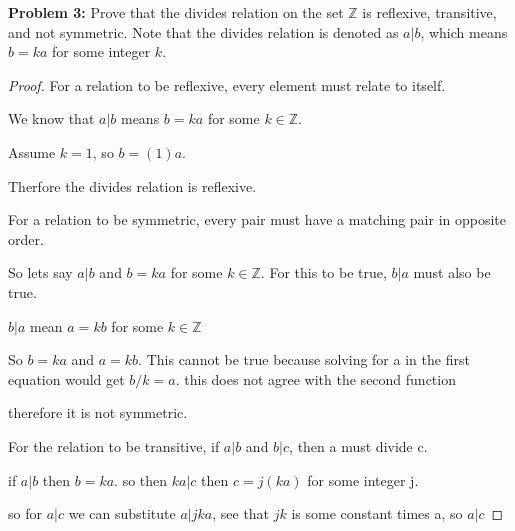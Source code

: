 \documentclass[12pt]{article}
\def\Z{\mathbb Z}
\begin{document}
{\bf Problem 3:} Prove that the divides relation on the set $\Z$ is reflexive, transitive, and not symmetric. Note that the divides relation is denoted as $a|b$, which means $b=ka$ for some integer $k$. 

\begin{proof}

    For a relation to be reflexive, every element must relate to itself.

    We know that $a|b$ means $b=ka$ for some $k\in\Z$. 
    
    Assume $k=1$, so $b=(1)a$.

    Therfore the divides relation is reflexive.

    For a relation to be symmetric, every pair must have a matching pair in opposite order.

    So lets say $a|b$ and $b=ka$ for some $k\in\Z$. For this to be true, $b|a$ must also be true.

    $b|a$ mean $a=kb$ for some $k\in\Z$
    
    So $b=ka$ and $a=kb$. This cannot be true because solving for a in the first equation would get $b/k = a$. this does not agree with the second function

    therefore it is not symmetric.
    

    For the relation to be transitive, if $a|b$ and $b|c$, then a must divide c.

    if $a|b$ then $b=ka$. so then $ka|c$ then $c=j(ka)$ for some integer j.

    so for $a|c$ we can substitute $a|jka$, see that $jk$ is some constant times a, so $a|c$


\end{proof}
\end{document}
